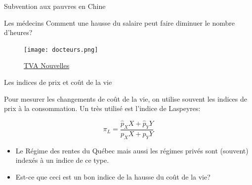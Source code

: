 \documentclass[handout]{beamer}
\begin{document}
\begin{frame}{Subvention aux pauvres en Chine}

\begin{figure}
\end{figure}

\end{frame}

\begin{frame}{Les médecins}
Comment une hausse du salaire peut faire diminuer le nombre d'heures?
\begin{figure}
\centering
\texttt{[image: docteurs.png]}
\caption{\href{https://www.tvanouvelles.ca/2018/05/17/medecins-de-familles-la-moitie-travaillent-4-jours-et-moins}{TVA Nouvelles}}
\end{figure}
\end{frame}

\begin{frame}{Les indices de prix et coût de la vie}

Pour mesurer les changements de coût de la vie, on utilise souvent les indices de prix à la consommation. Un très utilisé est l'indice de Laspeyres: 

$$ \pi_L = \frac{\hat p_X X + \hat p_Y Y}{p_X X + p_Y Y} $$

\begin{itemize}
\item Le Régime des rentes du Québec mais aussi les régimes privés sont (souvent) indexés à un indice de ce type. 
\item Est-ce que ceci est un bon indice de la hausse du coût de la vie?

\end{itemize}

\end{frame}
\end{document}

